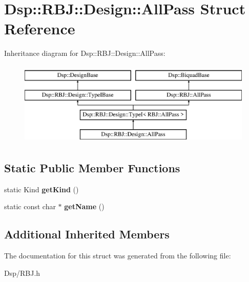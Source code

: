 \hypertarget{structDsp_1_1RBJ_1_1Design_1_1AllPass}{\section{Dsp\-:\-:R\-B\-J\-:\-:Design\-:\-:All\-Pass Struct Reference}
\label{structDsp_1_1RBJ_1_1Design_1_1AllPass}
}
Inheritance diagram for Dsp\-:\-:R\-B\-J\-:\-:Design\-:\-:All\-Pass\-:\begin{figure}[H]
\begin{center}
\leavevmode
\includegraphics[height=4.000000cm]{structDsp_1_1RBJ_1_1Design_1_1AllPass}
\end{center}
\end{figure}
\subsection*{Static Public Member Functions}
\begin{DoxyCompactItemize}
\item 
\hypertarget{structDsp_1_1RBJ_1_1Design_1_1AllPass_aac4111ac72cdea5fa3a3d58cfcc8bedd}{static Kind {\bfseries get\-Kind} ()}\label{structDsp_1_1RBJ_1_1Design_1_1AllPass_aac4111ac72cdea5fa3a3d58cfcc8bedd}

\item 
\hypertarget{structDsp_1_1RBJ_1_1Design_1_1AllPass_aa08216665152723832e7d9f15a27096f}{static const char $\ast$ {\bfseries get\-Name} ()}\label{structDsp_1_1RBJ_1_1Design_1_1AllPass_aa08216665152723832e7d9f15a27096f}

\end{DoxyCompactItemize}
\subsection*{Additional Inherited Members}


The documentation for this struct was generated from the following file\-:\begin{DoxyCompactItemize}
\item 
Dsp/R\-B\-J.\-h\end{DoxyCompactItemize}
